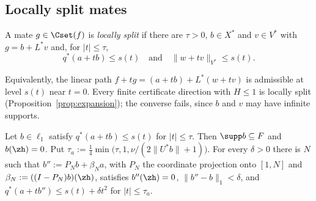 \subsection{Locally split mates}

\begin{definition}\label{def:locsplit}
A mate $g\in\Cset(f)$ is \emph{locally split} if there are $\tau>0$,
$b\in X^*$ and $v\in V^*$ with $g=b+L^*v$ and, for $|t|\le\tau$,
\[
 q^*(a+tb)\le s(t)\quad\text{and}\quad\|w+tv\|_{V^*}\le s(t).
\]
\end{definition}

Equivalently, the linear path $f+tg=(a+tb)+L^*(w+tv)$ is admissible at
level $s(t)$ near $t=0$.  Every finite certificate direction with $H\le1$
is locally split (Proposition~\ref{prop:expansion}); the converse fails,
since $b$ and $v$ may have infinite supports.

\begin{lemma}\label{lem:basetrunc}
Let $b\in\ell_1$ satisfy $q^*(a+tb)\le s(t)$ for $|t|\le\tau$.  Then
$\supp b\subseteq F$ and $b(\zh)=0$.  Put
$\tau_a:=\frac14\min\big(\tau,1,\nu/(2\|U^*b\|+1)\big)$.  For every
$\delta>0$ there is $N$ such that $b'':=P_Nb+\beta_Na$, with $P_N$ the
coordinate projection onto $[1,N]$ and $\beta_N:=((I-P_N)b)(\zh)$,
satisfies $b''(\zh)=0$, $\|b''-b\|_1<\delta$, and
$q^*(a+tb'')\le s(t)+\delta t^2$ for $|t|\le\tau_a$.
\end{lemma}

